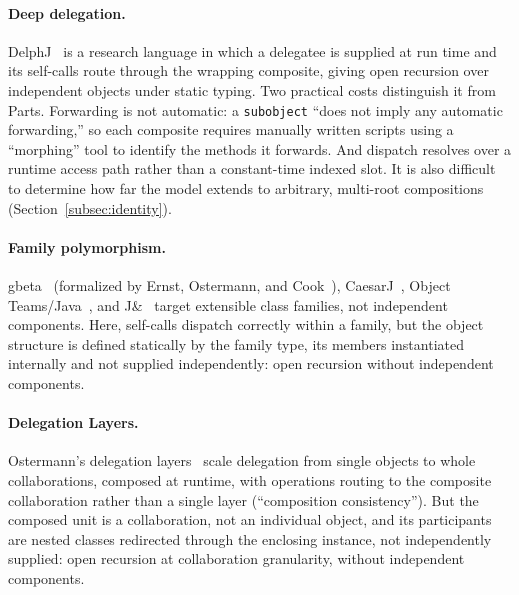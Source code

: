 \documentclass[sigplan,10pt,review,anonymous]{acmart}
\theoremstyle{acmplain}
\newcommand{\code}[1]{\texttt{#1}}
\begin{document}
\paragraph{Deep delegation.}
DelphJ~\cite{gerakios2013} is a research language in which a delegatee is supplied
at run time and its self-calls route through the wrapping composite, giving open
recursion over independent objects under static typing. Two practical costs
distinguish it from Parts. Forwarding is not automatic: a \code{subobject} ``does
not imply any automatic forwarding,'' so each composite requires manually written
scripts using a ``morphing'' tool to identify the methods it forwards. And dispatch
resolves over a runtime access path rather than a constant-time indexed slot. It is
also difficult to determine how far the model extends to arbitrary, multi-root compositions
(Section~\ref{subsec:identity}).

\paragraph{Family polymorphism.}
gbeta~\cite{ernst2001} (formalized by
Ernst, Ostermann, and Cook~\cite{ernst2006}), CaesarJ~\cite{aracic2006},
Object Teams/Java~\cite{herrmann2002}, and J\&~\cite{nystrom2006} target extensible class families,
not independent components. Here, self-calls dispatch correctly within a
family, but the object structure is defined statically by the family type, its
members instantiated internally and not supplied independently: open recursion
without independent components.

\paragraph{Delegation Layers.}
Ostermann's delegation layers~\cite{ostermann2002} scale delegation from single
objects to whole collaborations, composed at runtime, with operations routing to
the composite collaboration rather than a single layer (``composition
consistency''). But the composed unit is a collaboration, not an individual
object, and its participants are nested classes redirected through the enclosing
instance, not independently supplied: open recursion at collaboration
granularity, without independent components.
\end{document}
